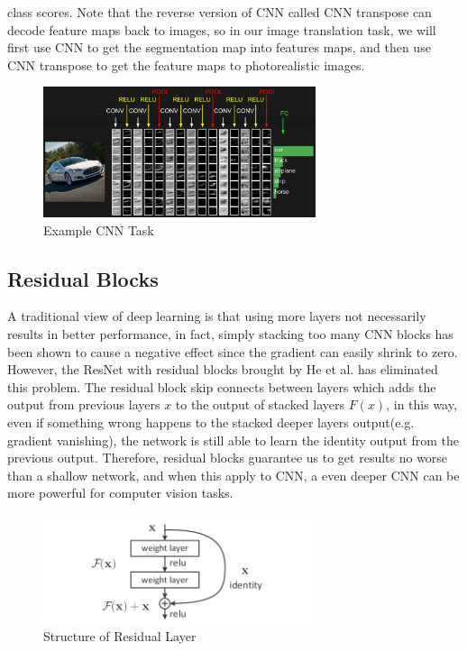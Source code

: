 class scores. Note that the reverse version of CNN called CNN transpose can decode feature maps back to images,
so in our image translation task, we will first use CNN to get the segmentation map into features maps, and then
use CNN transpose to get the feature maps to photorealistic images.
\begin{figure}[H]
    \begin{center}
    \includegraphics[width=8cm]{figures/convnet}
    \end{center}
    \caption{Example CNN Task}
    \label{fig:CNN}
\end{figure}

\subsection{Residual Blocks}
A traditional view of deep learning is that using more layers not necessarily results in better 
performance, in fact, simply stacking too many CNN blocks has been shown to cause a negative effect
since the gradient can easily shrink to zero. However, the ResNet with residual blocks brought by He et al. 
\cite{he2015deep} has eliminated this problem. The residual block skip connects between layers which adds
the output from previous layers $x$ to the output of stacked layers $F(x)$, in this way, even if something wrong
happens to the stacked deeper layers output(e.g. gradient vanishing), the network is still able to learn the 
identity output from the previous output. Therefore, residual blocks guarantee us to get results no worse than
a shallow network, and when this apply to CNN, a even deeper CNN can be more powerful for computer vision tasks.
\begin{figure}[H]
    \begin{center}
    \includegraphics[width=8cm]{figures/resnet}
    \end{center}
    \caption{Structure of Residual Layer}
    \label{fig:Res-structure}
\end{figure}

